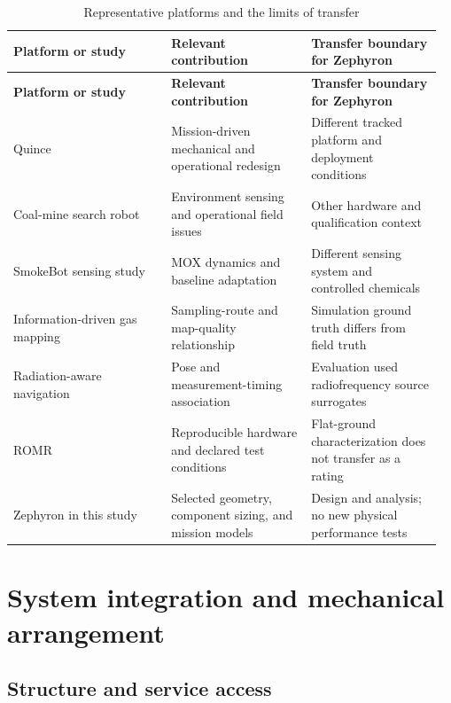 \documentclass[11pt,letterpaper]{article}
\begin{document}
\begingroup
\small
\setlength{\tabcolsep}{4pt}
\renewcommand{\arraystretch}{1.14}
\begin{longtable}{@{}>{\raggedright\arraybackslash}p{0.353\linewidth}>{\raggedright\arraybackslash}p{0.316\linewidth}>{\raggedright\arraybackslash}p{0.294\linewidth}@{}}
\caption{Representative platforms and the limits of transfer}\label{tab:1}\\
\toprule
\rowcolor{tablehead} \textbf{Platform or study} & \textbf{Relevant contribution} & \textbf{Transfer boundary for Zephyron} \\
\midrule
\endfirsthead
\toprule
\rowcolor{tablehead} \textbf{Platform or study} & \textbf{Relevant contribution} & \textbf{Transfer boundary for Zephyron} \\
\midrule
\endhead
\bottomrule
\endfoot
Quince & Mission-driven mechanical and operational redesign~\cite{LIT_QUINCE2011} & Different tracked platform and deployment conditions \\[2pt]
Coal-mine search robot & Environment sensing and operational field issues~\cite{LIT_COAL2017} & Other hardware and qualification context \\[2pt]
SmokeBot sensing study & MOX dynamics and baseline adaptation~\cite{LIT_GAS2019} & Different sensing system and controlled chemicals \\[2pt]
Information-driven gas mapping & Sampling-route and map-quality relationship~\cite{LIT_INFOMAP2023} & Simulation ground truth differs from field truth \\[2pt]
Radiation-aware navigation & Pose and measurement-timing association~\cite{LIT_RADNAV2021} & Evaluation used radiofrequency source surrogates \\[2pt]
ROMR & Reproducible hardware and declared test conditions~\cite{LIT_ROMR2023} & Flat-ground characterization does not transfer as a rating \\[2pt]
Zephyron in this study & Selected geometry, component sizing, and mission models & Design and analysis; no new physical performance tests \\[2pt]
\end{longtable}
\endgroup

\FloatBarrier
\section{System integration and mechanical arrangement}

\subsection{Structure and service access}
\end{document}
